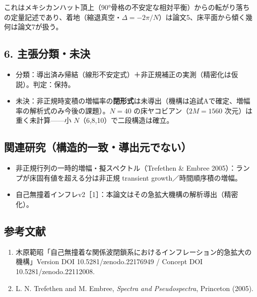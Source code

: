 \documentclass[
  a4paper,
]{ltjsarticle}
\providecommand{\tightlist}{%
  \setlength{\itemsep}{0pt}\setlength{\parskip}{0pt}}
\begin{document}
これはメキシカンハット頂上（90°骨格の不安定な相対平衡）からの転がり落ちの定量記述であり、着地（縮退真空・\(\Delta=-2\pi/N\)）は論文5、床平面から傾く幾何は論文7が扱う。

\subsection{6.
主張分類・未決}\label{ux4e3bux5f35ux5206ux985eux672aux6c7a}

\begin{itemize}
\tightlist
\item
  分類：導出済み帰結（線形不安定式）＋非正規補正の実測（精密化は仮説）。判定：保持。
\item
  未決：非正規時変積の増幅率の\textbf{閉形式}は未導出（機構は追試Aで確定、増幅率の解析式のみ今後の課題）。\(N=40\)
  の床ヤコビアン（\(2M=1560\) 次元）は重く未計算------小
  \(N\)（6,8,10）で二段構造は確立。
\end{itemize}

\subsection{関連研究（構造的一致・導出元でない）}\label{ux95a2ux9023ux7814ux7a76ux69cbux9020ux7684ux4e00ux81f4ux5c0eux51faux5143ux3067ux306aux3044}

\begin{itemize}
\tightlist
\item
  非正規行列の一時的増幅・擬スペクトル（Trefethen \& Embree
  2005）：ランプが床固有値を超える分は非正規 transient
  growth／時間順序積の増幅。
\item
  自己無撞着インフレv2［1］：本論文はその急拡大機構の解析導出（精密化）。
\end{itemize}

\subsection{参考文献}\label{ux53c2ux8003ux6587ux732e}

\begin{enumerate}
\def\labelenumi{\arabic{enumi}.}
\tightlist
\item
  木原範昭「自己無撞着な関係波閉鎖系におけるインフレーション的急拡大の機構」Version
  DOI 10.5281/zenodo.22176949 / Concept DOI 10.5281/zenodo.22112008.
\item
  L. N. Trefethen and M. Embree, \emph{Spectra and Pseudospectra},
  Princeton (2005).
\end{enumerate}
\end{document}
